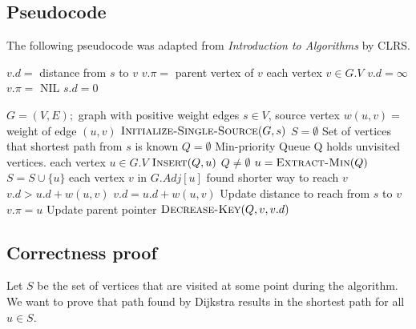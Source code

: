\documentclass{article}
\begin{document}
\subsection{Pseudocode}
The following pseudocode was adapted from \textit{Introduction to Algorithms} by CLRS\cite{CLRS}.

\begin{codebox}
\li \Comment $v.d = $ distance from $s$ to $v$
\li \Comment $v.\pi = $ parent vertex of $v$
\li
\li \For each vertex $v \in G.V$
\li     \Do
            $v.d = \infty$
\li         $v.\pi =$ NIL
        \End
\li $s.d = 0$
\end{codebox}

\begin{codebox}
\li \Comment $G = (V,E);$ graph with positive weight edges
\li \Comment $s \in V$, source vertex
\li \Comment $w(u,v) = $ weight of edge $(u,v)$
\li
\li $\textsc{Initialize-Single-Source}(G,s)$
\li $S = \emptyset$ \hspace{0.5cm}\Comment Set of vertices that shortest path from $s$ is known  
\li $Q = \emptyset$ \hspace{0.5cm}\Comment Min-priority Queue
\li                 \hspace{1.5cm}\Comment Q holds unvisited vertices.
\li \For each vertex $u \in G.V$
\li     \Do
            $\textsc{Insert}(Q,u)$
        \End
\li \While $Q \neq \emptyset$
\li     \Do
            $u = \textsc{Extract-Min}(Q)$
\li         $S = S \cup \{u\}$
\li     \For each vertex $v$ in $G.Adj[u]$
\li         \Do
                \Comment found shorter way to reach $v$
\li             \If $v.d > u.d + w(u,v)$
\li                 \Do
                        $v.d = u.d + w(u,v)$    \hspace{0.5cm}\Comment Update distance to reach from $s$ to $v$
\li                     $v.\pi = u$             \hspace{2.2cm}\Comment Update parent pointer
\li                     $\textsc{Decrease-Key}(Q,v,v.d)$
                    \End
            \End
        \End
\end{codebox}

\subsection{Correctness proof}
Let $S$ be the set of vertices that are visited at some point during the algorithm. We want to prove that path found by Dijkstra results in the shortest path for all $u \in S$. 
\end{document}
